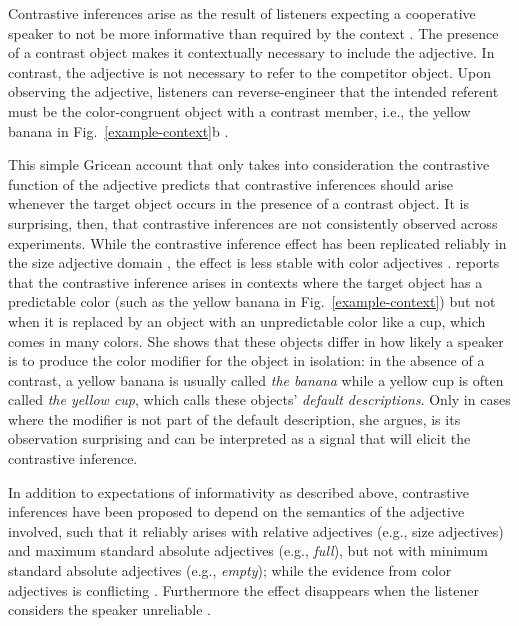 \documentclass[10pt,letterpaper]{article}
\newcommand{\figref}[1]{Fig.~\ref{#1}}
\begin{document}
Contrastive inferences arise as the result of listeners expecting a cooperative speaker to not be more informative than required by the context \cite{Grice:1975}. The presence of a contrast object makes it contextually necessary to include the adjective. In contrast, the adjective is not necessary to refer to the competitor object. Upon observing the adjective, listeners can reverse-engineer that the intended referent must be the color-congruent object with a contrast member, i.e., the yellow banana in \figref{example-context}b \cite{Aparicio:2018,Grodner:2011,Ryskin:2019,Sedivy:1999}.

This simple Gricean account that only takes into consideration the contrastive function of the adjective predicts that contrastive inferences should arise whenever the target object occurs in the presence of a contrast object. It is surprising, then, that contrastive inferences are not consistently observed across experiments. While the contrastive inference effect has been replicated reliably in the size adjective domain \cite{Aparicio:2018,Grodner:2011,Heller:2008,Ryskin:2019,Sedivy:1999}, the effect is less stable with color adjectives \cite{Sedivy:2003}.  reports that the contrastive inference arises in contexts where the target object has a predictable color (such as the yellow banana in \figref{example-context}) but not when it is replaced by an object with an unpredictable color like a cup, which comes in many colors.
She shows that these objects differ in how likely a speaker is to produce the color modifier for the object in isolation: in the absence of a contrast, a yellow banana is usually called \textit{the banana} while a yellow cup is often called \textit{the yellow cup}, which  calls these objects' \emph{default descriptions}. Only in cases where the modifier is not part of the default description, she argues, is its observation surprising and can be interpreted as a signal that will elicit the contrastive inference.

In addition to expectations of informativity as described above, contrastive inferences have been proposed to depend on the semantics of the adjective involved, such that it reliably arises with relative adjectives (e.g., size adjectives) and maximum standard absolute adjectives (e.g., \textit{full}), but not with minimum standard absolute adjectives (e.g., \textit{empty}); while the evidence from color adjectives is conflicting \cite{Rubio-Fernandez:2019,Sedivy:2003}. Furthermore the effect disappears when the listener considers the speaker unreliable \cite{Grodner:2011,Ryskin:2019}.
\end{document}
